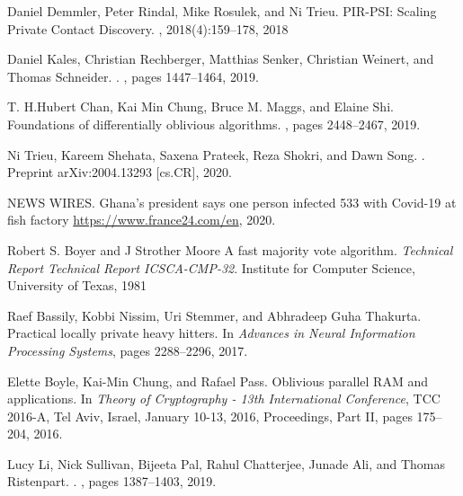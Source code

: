 \begin{thebibliography}{10}
\begin{small}
 Daniel Demmler, Peter Rindal, Mike Rosulek, and
Ni Trieu. \newblock PIR-PSI: Scaling Private Contact Discovery.
, 2018(4):159–178, 2018

Daniel Kales, Christian Rechberger, Matthias Senker, Christian Weinert, and
  Thomas Schneider.
.
, pages
  1447--1464, 2019.
  
 T. H.Hubert Chan, Kai Min Chung, Bruce M. Maggs, and Elaine Shi. \newblock  Foundations of differentially oblivious algorithms. , pages 2448–2467, 2019.

Ni Trieu, Kareem Shehata, Saxena Prateek, Reza Shokri, and Dawn Song.
.
\newblock  Preprint arXiv:2004.13293 [cs.CR], 2020.

NEWS WIRES.
\newblock Ghana's president says one person infected 533 with Covid-19 at fish factory
\newblock
  \url{https://www.france24.com/en},
  2020.

 Robert S. Boyer and J Strother Moore \newblock A fast majority vote algorithm. {\em Technical Report Technical Report ICSCA-CMP-32}. \newblock Institute for Computer Science, University of Texas, 1981

 Raef Bassily, Kobbi Nissim, Uri Stemmer, and Abhradeep Guha Thakurta. \newblock  Practical locally private heavy hitters. \newblock In {\em Advances in Neural Information Processing Systems}, pages 2288–2296, 2017.

 Elette Boyle, Kai-Min Chung, and Rafael Pass. \newblock  Oblivious parallel RAM and applications.  \newblock In {\em Theory of Cryptography - 13th International Conference}, TCC 2016-A, Tel Aviv, Israel, January 10-13, 2016, Proceedings, Part II, pages 175–204, 2016.

Lucy Li, Nick Sullivan, Bijeeta Pal, Rahul Chatterjee, Junade Ali, and Thomas
  Ristenpart.
.
, pages 1387--1403, 2019.


 
\end{small}
\end{thebibliography}



